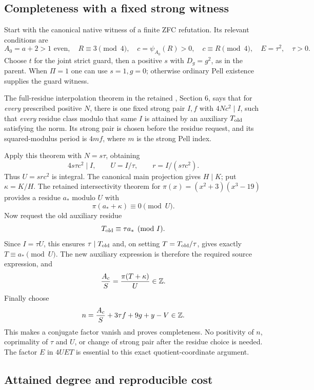 \subsection{Completeness with a fixed strong witness}

Start with the canonical native witness of a finite ZFC refutation.
Its relevant conditions are
\[
 A_0=a+2>1\text{ even},\quad R\equiv3\pmod4,\quad
 c=\psi_{A_0}(R)>0,\quad c\equiv R\pmod4,
 \quad E=\tau^2,\quad\tau>0.
\]
Choose $t$ for the joint strict guard, then a positive $s$ with
$D_g=g^2$, as in the parent.  When $\Pi=1$ one can use $s=1,g=0$;
otherwise ordinary Pell existence supplies the guard witness.

The full-residue interpolation theorem in the retained
, Section 6, says that for
\emph{every} prescribed positive $N$, there is one fixed strong pair
$I,f$ with $4Nc^2\mid I$, such that \emph{every} residue class modulo
that same $I$ is attained by an auxiliary $T_{\rm old}$ satisfying the
norm.  Its strong pair is chosen before the residue request, and its
squared-modulus period is $4mf$, where $m$ is the strong Pell index.

Apply this theorem with $N=s\tau$, obtaining
\[
 4s\tau c^2\mid I,\qquad U=I/\tau,
 \qquad r=I/(s\tau c^2).
\]
Thus $U=src^2$ is integral.  The canonical main projection gives
$H\mid K$; put $\kappa=K/H$.  The retained intersectivity theorem for
$\pi(x)=(x^2+3)(x^3-19)$ provides a residue $a_*$ modulo $U$ with
\[
 \pi(a_*+\kappa)\equiv0\pmod U.
\]
Now request the old auxiliary residue
\[
 T_{\rm old}\equiv\tau a_*\pmod I.
\]
Since $I=\tau U$, this ensures $\tau\mid T_{\rm old}$ and, on setting
$T=T_{\rm old}/\tau$, gives exactly $T\equiv a_*\pmod U$.
The new auxiliary expression is therefore the required source
expression, and
\[
 \frac{A_c}{S}=\frac{\pi(T+\kappa)}{U}\in\mathbb Z.
\]
Finally choose
\[
 n=\frac{A_c}{S}+3\tau f+9g+y-V\in\mathbb Z.
\]
This makes a conjugate factor vanish and proves completeness.
No positivity of $n$, coprimality of $\tau$ and $U$, or change of strong
pair after the residue choice is needed.  The factor $E$ in $4UET$ is
essential to this exact quotient-coordinate argument.

\subsection{Attained degree and reproducible cost}

